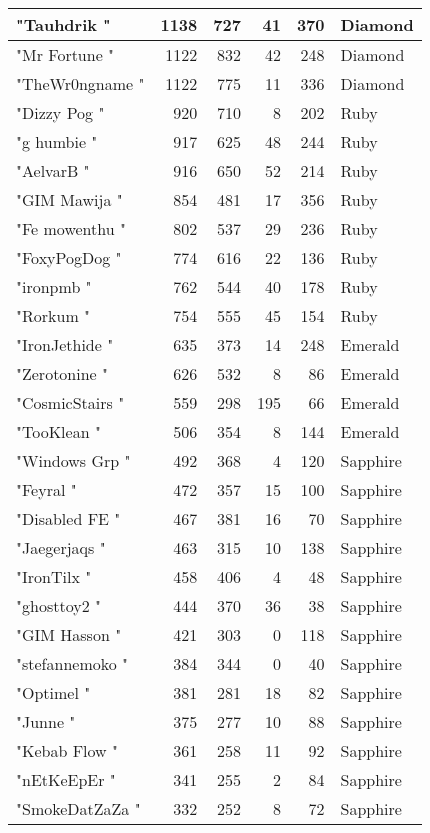 \documentclass{article}
\begin{document}
\begin{table}[htbp]
\begin{tabular}{|l|r|r|r|r|l|}
"Tauhdrik " & 1138 & 727 & 41 & 370 & Diamond \\ \hline
"Mr Fortune " & 1122 & 832 & 42 & 248 & Diamond \\ \hline
"TheWr0ngname " & 1122 & 775 & 11 & 336 & Diamond \\ \hline
"Dizzy Pog " & 920 & 710 & 8 & 202 & Ruby \\ \hline
"g humbie " & 917 & 625 & 48 & 244 & Ruby \\ \hline
"AelvarB " & 916 & 650 & 52 & 214 & Ruby \\ \hline
"GIM Mawija " & 854 & 481 & 17 & 356 & Ruby \\ \hline
"Fe mowenthu " & 802 & 537 & 29 & 236 & Ruby \\ \hline
"FoxyPogDog " & 774 & 616 & 22 & 136 & Ruby \\ \hline
"ironpmb " & 762 & 544 & 40 & 178 & Ruby \\ \hline
"Rorkum " & 754 & 555 & 45 & 154 & Ruby \\ \hline
"IronJethide " & 635 & 373 & 14 & 248 & Emerald \\ \hline
"Zerotonine " & 626 & 532 & 8 & 86 & Emerald \\ \hline
"CosmicStairs " & 559 & 298 & 195 & 66 & Emerald \\ \hline
"TooKlean " & 506 & 354 & 8 & 144 & Emerald \\ \hline
"Windows Grp " & 492 & 368 & 4 & 120 & Sapphire \\ \hline
"Feyral " & 472 & 357 & 15 & 100 & Sapphire \\ \hline
"Disabled FE " & 467 & 381 & 16 & 70 & Sapphire \\ \hline
"Jaegerjaqs " & 463 & 315 & 10 & 138 & Sapphire \\ \hline
"IronTilx " & 458 & 406 & 4 & 48 & Sapphire \\ \hline
"ghosttoy2 " & 444 & 370 & 36 & 38 & Sapphire \\ \hline
"GIM Hasson " & 421 & 303 & 0 & 118 & Sapphire \\ \hline
"stefannemoko " & 384 & 344 & 0 & 40 & Sapphire \\ \hline
"Optimel " & 381 & 281 & 18 & 82 & Sapphire \\ \hline
"Junne " & 375 & 277 & 10 & 88 & Sapphire \\ \hline
"Kebab Flow " & 361 & 258 & 11 & 92 & Sapphire \\ \hline
"nEtKeEpEr " & 341 & 255 & 2 & 84 & Sapphire \\ \hline
"SmokeDatZaZa " & 332 & 252 & 8 & 72 & Sapphire \\ \hline

\end{tabular}
\end{table}
\end{document}
